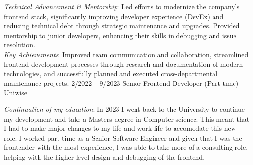 \documentclass[9pt]{developercv} %
\begin{document}
\begin{entrylist}
{			\textit{Technical Advancement \& Mentorship}: Led efforts to modernize the company's frontend stack, significantly improving developer experience (DevEx) and reducing technical debt through strategic maintenance and upgrades. Provided mentorship to junior developers, enhancing their skills in debugging and issue resolution.\\

			\textit{Key Achievements}: Improved team communication and collaboration, streamlined frontend development processes through research and documentation of modern technologies, and successfully planned and executed cross-departmental maintenance projects.
		}
		\entry
		{2/2022 -- 9/2023}
		{Senior Frontend Developer (\footnotesize{Part time})}
		{Uniwise}
		{

			\textit{Continuation of my education}: In 2023 I went back to the University to continue my development and take a Masters degree in Computer science. This meant that I had to make major changes to my life and work life to accomodate this new role.
			I worked part time as a Senior Software Engineer and given that I was the frontender with the most experience, I was able to take more of a consulting role, helping with the higher level design and debugging of the frontend.
		}
\end{entrylist}


\end{document}

